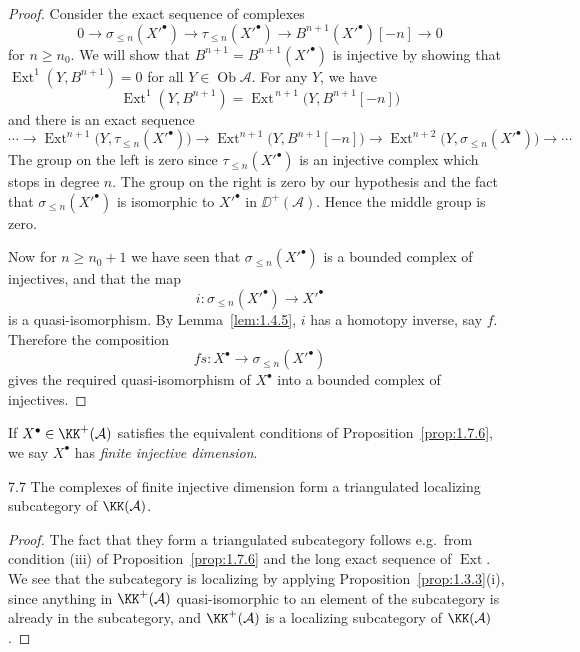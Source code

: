 \begin{proof}
Consider the exact sequence of complexes
\[
0 \to \sigma_{\le n}(X'^\bullet) \to \tau_{\le n}(X'^\bullet) \to B^{n+1}(X'^\bullet)[-n] \to 0
\]
for $n\ge n_0$. We will show that $B^{n+1}=B^{n+1}(X'^\bullet)$ is injective by
showing that $\operatorname{Ext}^1(Y,B^{n+1})=0$ for all $Y\in\operatorname{Ob}\mathcal{A}$.
For any $Y$, we have
\[
\operatorname{Ext}^1(Y,B^{n+1}) = \operatorname{Ext}^{\,n+1}\big(Y,B^{n+1}[-n]\big)
\]
and there is an exact sequence
\[
\cdots \to \operatorname{Ext}^{n+1}\big(Y,\tau_{\le n}(X'^\bullet)\big)
\to \operatorname{Ext}^{n+1}\big(Y,B^{n+1}[-n]\big)
\to \operatorname{Ext}^{n+2}\big(Y,\sigma_{\le n}(X'^\bullet)\big) \to \cdots
\]
The group on the left is zero since $\tau_{\le n}(X'^\bullet)$ is an injective
complex which stops in degree $n$. The group on the right is zero by
our hypothesis and the fact that $\sigma_{\le n}(X'^\bullet)$ is isomorphic to
$X'^\bullet$ in $\DD^+(\mathcal{A})$. Hence the middle group is zero.

Now for $n\ge n_0+1$ we have seen that $\sigma_{\le n}(X'^\bullet)$ is a bounded
complex of injectives, and that the map
\[
i\colon \sigma_{\le n}(X'^\bullet) \to X'^\bullet
\]
is a quasi-isomorphism. By Lemma~\ref{lem:1.4.5}, $i$ has a homotopy inverse,
say $f$. Therefore the composition
\[
fs\colon X^\bullet \to \sigma_{\le n}(X'^\bullet)
\]
gives the required quasi-isomorphism of $X^\bullet$ into a bounded complex
of injectives.
\end{proof}

\begin{definition*}
If $X^\bullet\in\KK^+(\mathcal{A})$ satisfies the equivalent conditions of Proposition~\ref{prop:1.7.6}, we say $X^\bullet$ has \emph{finite injective dimension}.
\end{definition*}

\begin{bookcorollary}{7.7}\label{cor:1.7.7}
The complexes of finite injective dimension form a triangulated localizing subcategory of $\KK(\mathcal{A})$.
\end{bookcorollary}

\begin{proof}
The fact that they form a triangulated subcategory follows e.g.\ from condition (iii) of Proposition~\ref{prop:1.7.6} and the long exact sequence of $\operatorname{Ext}$. We see that the subcategory is localizing by applying Proposition~\ref{prop:1.3.3}(i), since anything in $\KK^+(\mathcal{A})$ quasi-isomorphic to an element of the subcategory is already in the subcategory, and $\KK^+(\mathcal{A})$ is a localizing subcategory of $\KK(\mathcal{A})$.
\end{proof}

